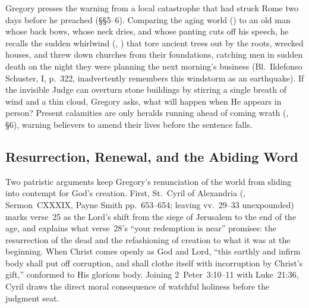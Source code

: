 Gregory presses the warning from a local catastrophe that had struck Rome two days before he preached (\S\S5--6). Comparing the aging world () to an old man whose back bows, whose neck dries, and whose panting cuts off his speech, he recalls the sudden whirlwind (, ) that tore ancient trees out by the roots, wrecked houses, and threw down churches from their foundations, catching men in sudden death on the night they were planning the next morning's business (Bl.~Ildefonso Schuster, I, p.~322, inadvertently remembers this windstorm as an earthquake). If the invisible Judge can overturn stone buildings by stirring a single breath of wind and a thin cloud, Gregory asks, what will happen when He appears in person? Present calamities are only heralds running ahead of coming wrath (, \S6), warning believers to amend their lives before the sentence falls.

\subsection{Resurrection, Renewal, and the Abiding Word}

Two patristic arguments keep Gregory's renunciation of the world from sliding into contempt for God's creation. First, St.~Cyril of Alexandria (, Sermon~CXXXIX, Payne Smith pp.~653--654; leaving vv.~29--33 unexpounded) marks verse~25 as the Lord's shift from the siege of Jerusalem to the end of the age, and explains what verse~28's ``your redemption is near'' promises: the resurrection of the dead and the refashioning of creation to what it was at the beginning. When Christ comes openly as God and Lord, ``this earthly and infirm body shall put off corruption, and shall clothe itself with incorruption by Christ's gift,'' conformed to His glorious body. Joining 2~Peter~3:10--11 with Luke~21:36, Cyril draws the direct moral consequence of watchful holiness before the judgment seat.

